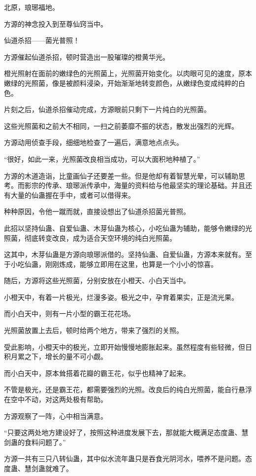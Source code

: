 \begin{this_body}
北原，琅琊福地。

方源的神念投入到至尊仙窍当中。

仙道杀招——菌光普照！

方源催起仙道杀招，顿时营造出一股璀璨的橙黄华光。

橙光照射在面前的嫩绿色的光照菌上，光照菌开始变化。以肉眼可见的速度，原本嫩绿的光照菌，像是被颜料浸染，开始渐渐地转变颜色，从嫩绿色变成纯粹的白色。

片刻之后，仙道杀招催动完成，方源眼前只剩下一片纯白的光照菌。

这些光照菌和之前大不相同，一扫之前萎靡不振的状态，散发出强烈的光辉。

方源动用侦查手段，细细地检查了一遍后，满意地点点头。

“很好，如此一来，光照菌改良相当成功，可以大面积地种植了。”

方源的木道造诣，比童画仙子还要差一些。但是他却有着智慧光晕，可以辅助思考。而影宗的传承、琅琊派传承中，海量的资料给与他最坚实的理论基础。并且还有大量的仙蛊握在手中，或者可以借得来。

种种原因，令他一蹴而就，直接设想出了仙道杀招菌光普照。

此招以坚持仙蛊、自爱仙蛊、木芽仙蛊为核心，小吃仙蛊为辅助，能够令嫩绿的光照菌，彻底转变改良，成为适合天空环境的纯白光照菌。

这其中，木芽仙蛊是方源向琅琊派借的。坚持仙蛊、自爱仙蛊，方源本来就有。至于小吃仙蛊，刚刚炼成，能够立即用在这里，也算是一个小小的惊喜。

随后，方源将这些光照菌，分别安放在小橙天、小白天当中。

小橙天中，有着一片极光，烂漫多姿。极光之中，孕育着果实，正是流光果。

而小白天中，则有一片小型的霸王花花场。

光照菌放置上去后，顿时给两个地方，带来了强烈的关照。

受此影响，小橙天中的极光，立即开始慢慢地膨胀起来。虽然程度有些轻微，但日积月累之下，增长的量不可小觑。

而小白天中，原本耸搭着花瓣的霸王花，似乎也精神了起来。

不管是极光，还是霸王花，都需要强烈的光照。改良后的纯白光照菌，能自行悬浮在空中不动，对这两处极有帮助。

方源观察了一阵，心中相当满意。

“只要这两处地方建设好了，按照这种进度发展下去，那就能大概满足态度蛊、慧剑蛊的食料问题了。”

方源一共有三只八转仙蛊，其中似水流年蛊只是吞食光阴河水，喂养不是问题。态度蛊、慧剑蛊就难了。


\end{this_body}
